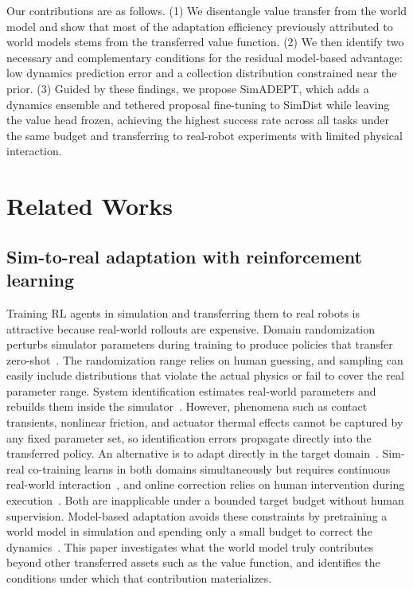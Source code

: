 \documentclass{article} %
\begin{document}
Our contributions are as follows. (1) We disentangle value transfer from the world model and show that most of the adaptation efficiency previously attributed to world models stems from the transferred value function. (2) We then identify two necessary and complementary conditions for the residual model-based advantage: low dynamics prediction error and a collection distribution constrained near the prior. (3) Guided by these findings, we propose SimADEPT, which adds a dynamics ensemble and tethered proposal fine-tuning to SimDist while leaving the value head frozen, achieving the highest success rate across all tasks under the same budget and transferring to real-robot experiments with limited physical interaction.

\section{Related Works}
\label{relatedwork}

\subsection{Sim-to-real adaptation with reinforcement learning}
\label{sec:rela-sim2real}

Training RL agents in simulation and transferring them to real robots is attractive because real-world rollouts are expensive. Domain randomization perturbs simulator parameters during training to produce policies that transfer zero-shot~\citep{tobin2017domain, peng2018sim, tiboni2023dropo, tiboni2024domain}. The randomization range relies on human guessing, and sampling can easily include distributions that violate the actual physics or fail to cover the real parameter range. System identification estimates real-world parameters and rebuilds them inside the simulator~\citep{ramos2019bayessim, chebotar2019closing, memmel2024asid, xu2026deal}. However, phenomena such as contact transients, nonlinear friction, and actuator thermal effects cannot be captured by any fixed parameter set, so identification errors propagate directly into the transferred policy. An alternative is to adapt directly in the target domain~\citep{torne2024reconciling}. Sim-real co-training learns in both domains simultaneously but requires continuous real-world interaction~\citep{maddukuri2025sim, shi2026beyond}, and online correction relies on human intervention during execution~\citep{pmlr-v270-jiang25a}. Both are inapplicable under a bounded target budget without human supervision. Model-based adaptation avoids these constraints by pretraining a world model in simulation and spending only a small budget to correct the dynamics~\citep{yin2025rapidly, levy2026simulation}. This paper investigates what the world model truly contributes beyond other transferred assets such as the value function, and identifies the conditions under which that contribution materializes.
\end{document}
